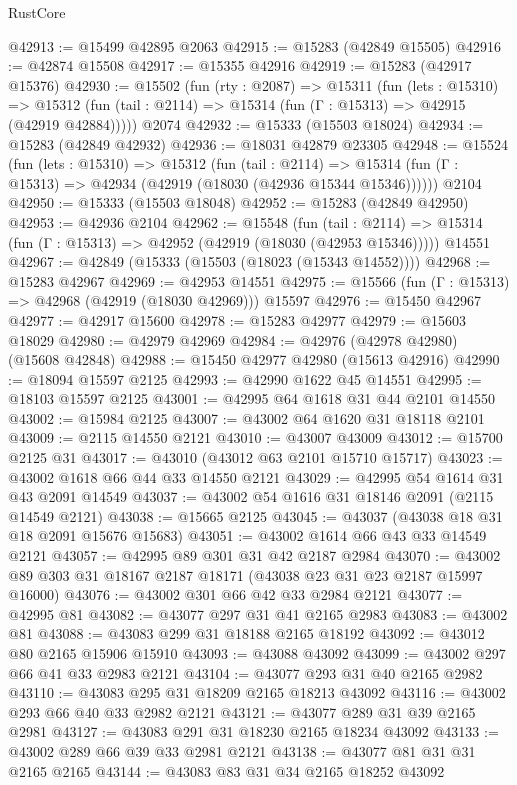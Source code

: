 \begin{lexlean}{RustCore}
\begin{coremodule}
@42913 := @15499 @42895 @2063
@42915 := @15283 (@42849 @15505)
@42916 := @42874 @15508
@42917 := @15355 @42916
@42919 := @15283 (@42917 @15376)
@42930 := @15502
    (fun (rty : @2087) =>
    @15311
      (fun (lets : @15310) =>
      @15312 (fun (tail : @2114) => @15314 (fun (Γ : @15313) => @42915 (@42919 @42884)))))
    @2074
@42932 := @15333 (@15503 @18024)
@42934 := @15283 (@42849 @42932)
@42936 := @18031 @42879 @23305
@42948 := @15524
    (fun (lets : @15310) =>
    @15312
      (fun (tail : @2114) =>
      @15314 (fun (Γ : @15313) => @42934 (@42919 (@18030 (@42936 @15344 @15346))))))
    @2104
@42950 := @15333 (@15503 @18048)
@42952 := @15283 (@42849 @42950)
@42953 := @42936 @2104
@42962 := @15548
    (fun (tail : @2114) => @15314 (fun (Γ : @15313) => @42952 (@42919 (@18030 (@42953 @15346)))))
    @14551
@42967 := @42849 (@15333 (@15503 (@18023 (@15343 @14552))))
@42968 := @15283 @42967
@42969 := @42953 @14551
@42975 := @15566 (fun (Γ : @15313) => @42968 (@42919 (@18030 @42969))) @15597
@42976 := @15450 @42967
@42977 := @42917 @15600
@42978 := @15283 @42977
@42979 := @15603 @18029
@42980 := @42979 @42969
@42984 := @42976 (@42978 @42980) (@15608 @42848)
@42988 := @15450 @42977 @42980 (@15613 @42916)
@42990 := @18094 @15597 @2125
@42993 := @42990 @1622 @45 @14551
@42995 := @18103 @15597 @2125
@43001 := @42995 @64 @1618 @31 @44 @2101 @14550
@43002 := @15984 @2125
@43007 := @43002 @64 @1620 @31 @18118 @2101
@43009 := @2115 @14550 @2121
@43010 := @43007 @43009
@43012 := @15700 @2125 @31
@43017 := @43010 (@43012 @63 @2101 @15710 @15717)
@43023 := @43002 @1618 @66 @44 @33 @14550 @2121
@43029 := @42995 @54 @1614 @31 @43 @2091 @14549
@43037 := @43002 @54 @1616 @31 @18146 @2091 (@2115 @14549 @2121)
@43038 := @15665 @2125
@43045 := @43037 (@43038 @18 @31 @18 @2091 @15676 @15683)
@43051 := @43002 @1614 @66 @43 @33 @14549 @2121
@43057 := @42995 @89 @301 @31 @42 @2187 @2984
@43070 := @43002 @89 @303 @31 @18167 @2187 @18171 (@43038 @23 @31 @23 @2187 @15997 @16000)
@43076 := @43002 @301 @66 @42 @33 @2984 @2121
@43077 := @42995 @81
@43082 := @43077 @297 @31 @41 @2165 @2983
@43083 := @43002 @81
@43088 := @43083 @299 @31 @18188 @2165 @18192
@43092 := @43012 @80 @2165 @15906 @15910
@43093 := @43088 @43092
@43099 := @43002 @297 @66 @41 @33 @2983 @2121
@43104 := @43077 @293 @31 @40 @2165 @2982
@43110 := @43083 @295 @31 @18209 @2165 @18213 @43092
@43116 := @43002 @293 @66 @40 @33 @2982 @2121
@43121 := @43077 @289 @31 @39 @2165 @2981
@43127 := @43083 @291 @31 @18230 @2165 @18234 @43092
@43133 := @43002 @289 @66 @39 @33 @2981 @2121
@43138 := @43077 @81 @31 @31 @2165 @2165
@43144 := @43083 @83 @31 @34 @2165 @18252 @43092

\end{coremodule}
\end{lexlean}
